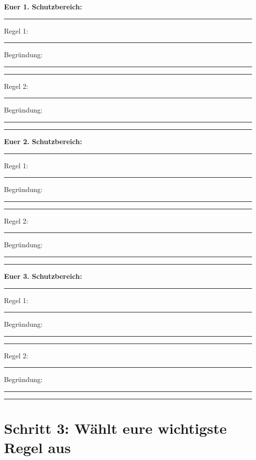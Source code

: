 \documentclass[12pt, a4paper]{article}
\newenvironment{taskbox}{%
    \begin{framed}
        \color{black}
    }{%
    \end{framed}
}
\begin{document}
    \textbf{\color{sectioncolor}Euer 1. Schutzbereich:} \rule{8cm}{0.4pt}

    \begin{taskbox}
        Regel 1: \rule{\linewidth}{0.4pt}

        Begründung: \rule{\linewidth}{0.4pt}
        \rule{\linewidth}{0.4pt}

        \vspace{0.5cm}

        Regel 2: \rule{\linewidth}{0.4pt}

        Begründung: \rule{\linewidth}{0.4pt}
        \rule{\linewidth}{0.4pt}
    \end{taskbox}

    \vspace{0.3cm}

    \textbf{\color{sectioncolor}Euer 2. Schutzbereich:} \rule{8cm}{0.4pt}

    \begin{taskbox}
        Regel 1: \rule{\linewidth}{0.4pt}

        Begründung: \rule{\linewidth}{0.4pt}
        \rule{\linewidth}{0.4pt}

        \vspace{0.5cm}

        Regel 2: \rule{\linewidth}{0.4pt}

        Begründung: \rule{\linewidth}{0.4pt}
        \rule{\linewidth}{0.4pt}
    \end{taskbox}
    \vspace{0.3cm}
\pagebreak

    \textbf{\color{sectioncolor}Euer 3. Schutzbereich:} \rule{8cm}{0.4pt}

    \begin{taskbox}
        Regel 1: \rule{\linewidth}{0.4pt}

        Begründung: \rule{\linewidth}{0.4pt}
        \rule{\linewidth}{0.4pt}

        \vspace{0.5cm}

        Regel 2: \rule{\linewidth}{0.4pt}

        Begründung: \rule{\linewidth}{0.4pt}
        \rule{\linewidth}{0.4pt}
    \end{taskbox}

    \vspace{0.3cm}

    \section*{\large\color{headercolor}Schritt 3: Wählt eure wichtigste Regel aus}
    
\end{document}
